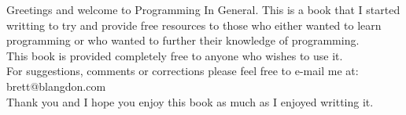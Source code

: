 Greetings and welcome to Programming In General. This is a book that I started writting to try and provide
free resources to those who either wanted to learn programming or who wanted to further their knowledge of
programming.
\newline
\\
This book is provided completely free to anyone who wishes to use it.
\newline
\\
For suggestions, comments or corrections please feel free to e-mail me at:
\newline
brett@blangdon.com
\newline
\\
Thank you and I hope you enjoy this book as much as I enjoyed writting it.
